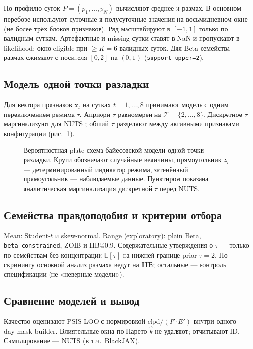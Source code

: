 \documentclass{article}
\begin{document}
По профилю суток \(P=(p_1,\ldots,p_N)\) вычисляют среднее и размах. В основном переборе используют суточные и полусуточные значения на восьмидневном окне (не более трёх блоков признаков). Ряд масштабируют в \([-1,1]\) только по валидным суткам. Артефактные и missing сутки ставят в NaN и пропускают в likelihood; окно eligible при \(\ge K=6\) валидных суток. Для Beta-семейства размах сжимают с носителя \([0,2]\) на \((0,1)\) (\texttt{support\_upper=2}).

\subsection{Модель одной точки разладки}

Для вектора признаков \(\mathbf{x}_t\) на сутках \(t=1,\ldots,8\) принимают модель с одним переключением режима \(\tau\). Априори \(\tau\) равномерен на \(\mathcal{T}=\{2,\ldots,8\}\). Дискретное \(\tau\) маргинализуют для NUTS \cite{HoffmanGelman2014}; общий \(\tau\) разделяют между активными признаками конфигурации (рис.~\ref{fig:tau-model}).

\begin{figure}[t]
  \centering
  \resizebox{\textwidth}{!}{}
  \caption{Вероятностная plate-схема байесовской модели одной точки разладки.
  Круги обозначают случайные величины, прямоугольник \(z_t\) ---
  детерминированный индикатор режима, затенённый прямоугольник ---
  наблюдаемые данные. Пунктиром показана аналитическая маргинализация
  дискретной \(\tau\) перед NUTS.}
  \label{fig:tau-model}
\end{figure}

\subsection{Семейства правдоподобия и критерии отбора}

Mean: Student-\(t\) и skew-normal. Range (exploratory): plain Beta, \texttt{beta\_constrained}, ZOIB и IIB@0.9.
Содержательные утверждения о \(\tau\) --- только по семействам без концентрации \(\mathbb{E}[\tau]\) на нижней границе prior \(\tau=2\). По скринингу основной анализ размаха ведут на \textbf{IIB}; остальные --- контроль спецификации (не «неверные модели»).

\subsection{Сравнение моделей и вывод}

Качество оценивают PSIS-LOO \cite{Vehtari2017} с нормировкой \(\overline{\mathrm{elpd}}/(F\cdot E')\) внутри одного day-mask builder. Влиятельные окна по Парето-\(\hat k\) не удаляют; отчитывают ID. Сэмплирование --- NUTS (в т.ч.\ BlackJAX).
\end{document}
